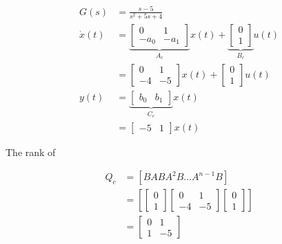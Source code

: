 \documentclass[main.tex]{subfiles}
\begin{document}
\begin{enumerate}
\begin{enumerate}
        $$
        \begin{aligned}
        G(s) &= \frac{s-5}{s^2+5s+4}\\
        \dot{x}(t) & =\underbrace{\left[\begin{array}{ccc}
        0 & 1 \\
        -a_0 & -a_1
        \end{array}\right]}_{A_c}x(t)+\underbrace{\left[\begin{array}{l}
        0 \\
        1
        \end{array}\right]}_{B_c} u(t) \\
        & =\left[\begin{array}{cc}
        0 & 1 \\
        -4 & -5
        \end{array}\right]x(t)+\left[\begin{array}{l}
        0 \\
        1
        \end{array}\right] u(t) \\
        y(t) & =\underbrace{\left[\begin{array}{ll}
        b_0 & b_1
        \end{array}\right]}_{C_c}x(t)\\
        & =\left[\begin{array}{ll}
        -5 & 1
        \end{array}\right]x(t)
        \end{aligned}
        $$
        
        The rank of
        
        $$
        \begin{aligned}  
        Q_c &= \left[B A B A^2 B \ldots A^{n-1} B\right]\\
        &= \left[\left[\begin{array}{l}
        0 \\
        1
        \end{array}\right] \left[\begin{array}{cc}
        0 & 1 \\
        -4 & -5
        \end{array}\right] \left[\begin{array}{l}
        0 \\
        1
        \end{array}\right] \right]\\
        & = \left[\begin{array}{cc}
        0 & 1 \\
        1 & -5
        \end{array}\right]
        \end{aligned}
        $$
        

\end{enumerate}
\end{enumerate}
\end{document}
